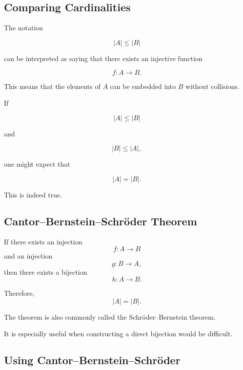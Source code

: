\subsection{Comparing Cardinalities}
\label{subsec:comparing-cardinalities}

The notation

\[ |A|\leq|B| \]

can be interpreted as saying that there exists an injective function

\[ f:A\to B. \]

This means that the elements of \(A\) can be embedded into \(B\) without
collisions.

If

\[ |A|\leq|B| \]

and

\[ |B|\leq|A|, \]

one might expect that

\[ |A|=|B|. \]

This is indeed true.

\subsection{Cantor--Bernstein--Schröder Theorem}
\label{subsec:cantor-bernstein-schroeder}

\begin{theorem}
If there exists an injection
\[ f:A\to B \]
and an injection
\[ g:B\to A, \]
then there exists a bijection
\[ h:A\to B. \]

Therefore,
\[ |A|=|B|. \]
\end{theorem}

The theorem is also commonly called the Schröder--Bernstein theorem.

It is especially useful when constructing a direct bijection would be
difficult.

\subsection{Using Cantor--Bernstein--Schröder}
\label{subsec:using-cbs}

